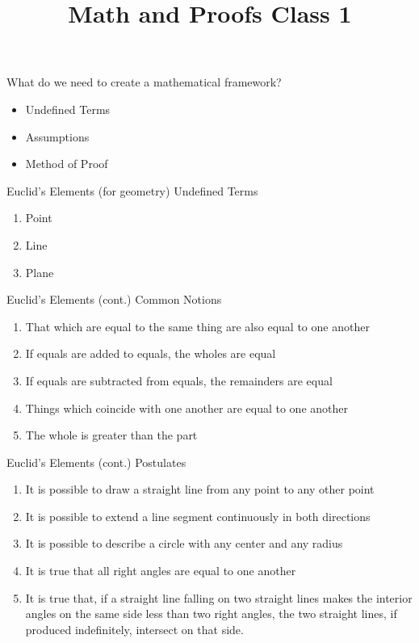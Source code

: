 \documentclass{beamer}
\begin{document}
\title[Math and Proofs]{Math and Proofs Class 1}

\begin{frame}[plain]
\titlepage
\end{frame}

\begin{frame}{What do we need to create a mathematical framework?}
\begin{itemize}
\item Undefined Terms
\item Assumptions
\item Method of Proof
\end{itemize}
\end{frame}

\begin{frame}{Euclid's Elements (for geometry)}
Undefined Terms
\begin{enumerate}
\item Point
\item Line
\item Plane
\end{enumerate}
\end{frame}

\begin{frame}{Euclid's Elements (cont.)}
Common Notions
\begin{enumerate}
\item That which are equal to the same thing are also equal to one another
\item If equals are added to equals, the wholes are equal
\item If equals are subtracted from equals, the remainders are equal
\item Things which coincide with one another are equal to one another
\item The whole is greater than the part
\end{enumerate}
\end{frame}

\begin{frame}{Euclid's Elements (cont.)}
Postulates
\begin{enumerate}
\item It is possible to draw a straight line from any point to any other point
\item It is possible to extend a line segment continuously in both directions
\item It is possible to describe a circle with any center and any radius
\item It is true that all right angles are equal to one another
\item It is true that, if a straight line falling on two straight lines makes the interior angles on the same side less than two right angles, the two straight lines, if produced indefinitely, intersect on that side.
\end{enumerate}
\end{frame}
\end{document}
